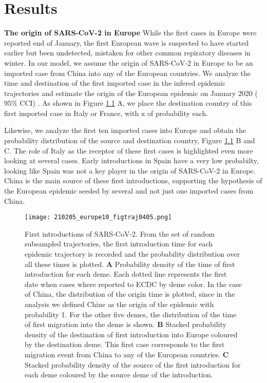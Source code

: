 \chapter{Results}

\textbf{The origin of SARS-CoV-2 in Europe} 
While the first cases in Europe were reported end of January, the first European wave is suspected to have started earlier but been undetected, mistaken for other common repiratory diseases in winter. In our model, we assume the origin of SARS-CoV-2 in Europe to be an imported case from China into any of the European countries. We analyze the time and destination of the first imported case in the infered epidemic trajectories and estimate the origin of the European epidemic on January 2020 ($95\%$ CCI)  . As shown in Figure \ref{fig:firstEUcase} A, we place the destination country of this first imported case in Italy or France, with x of probability each.  

Likewise, we analyze the first ten imported cases into Europe and obtain the probability distribution of the source and destination country, Figure \ref{fig:firstEUcase} B and C.  The role of Italy as the receptor of these first cases is highlighted even more looking at several cases. Early introductions in Spain have a very low probabilty, looking like Spain was not a key player in the origin of SARS-CoV-2 in Europe. China is the main source of these first introductions, supporting the hypothesis of the European epidemic seeded by several and not just one imported cases from China. 

\begin{figure}[p]
    \centering
    \texttt{[image: 210205\_europe10\_figtraj0405.png]}
    \caption{First introductions of SARS-CoV-2. From the set of random subsampled trajectories, the first introduction time for each epidemic trajectory is recorded and the probability distribution over all these times is plotted. \textbf{A} Probability density of the time of first introduction for each deme. Each dotted line represents the first date when cases where reported to ECDC by deme color. In the case of China, the distribution of the origin time is plotted, since in the analysis we defined Chine as the origin of the epidemic with probability 1. For the other five demes, the distribution of the time of first migration into the deme is shown. \textbf{B} Stacked probability density of the destination of first introduction into Europe coloured by the destination deme. This first case corresponds to the first migration event from China to any of the European countries. \textbf{C} Stacked probability density of the source of the first introduction for each deme coloured by the source deme of the introduction.}
    \label{fig:firstEUcase}
\end{figure}


